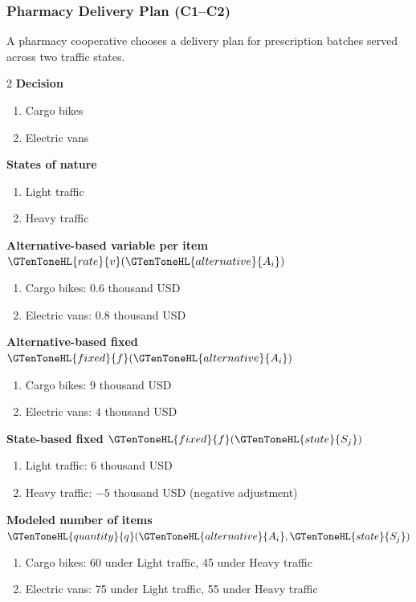 
	\subsubsection{Pharmacy Delivery Plan (C1--C2)}
	\label{sec:problem30-pharmacy-delivery-plan-c1-c2}
	A pharmacy cooperative chooses a delivery plan for prescription batches served across two traffic states.
	\begin{multicols}{2}
	\textbf{Decision }
	\begin{enumerate}[label=\arabic*.]
\item Cargo bikes
\item Electric vans
	\end{enumerate}
	\textbf{States of nature}
	\begin{enumerate}[label=\arabic*.]
\item Light traffic
\item Heavy traffic
	\end{enumerate}
	\columnbreak
	\textbf{Alternative-based variable  per item $\GTenToneHL{rate}{v}(\GTenToneHL{alternative}{A_i})$}
\begin{enumerate}[label=\arabic*.]
\item Cargo bikes: $0.6$ thousand USD
\item Electric vans: $0.8$ thousand USD\end{enumerate}
\textbf{Alternative-based fixed  $\GTenToneHL{fixed}{f}(\GTenToneHL{alternative}{A_i})$}
\begin{enumerate}[label=\arabic*.]
\item Cargo bikes: $9$ thousand USD
\item Electric vans: $4$ thousand USD\end{enumerate}
\textbf{State-based fixed  $\GTenToneHL{fixed}{f}(\GTenToneHL{state}{S_j})$}
\begin{enumerate}[label=\arabic*.]
\item Light traffic: $6$ thousand USD
\item Heavy traffic: $-5$ thousand USD (negative adjustment)\end{enumerate}
\textbf{Modeled number of items $\GTenToneHL{quantity}{q}(\GTenToneHL{alternative}{A_i},\GTenToneHL{state}{S_j})$}
\begin{enumerate}[label=\arabic*.]
\item Cargo bikes: 60 under Light traffic, 45 under Heavy traffic
\item Electric vans: 75 under Light traffic, 55 under Heavy traffic
\end{enumerate}
	\end{multicols}

